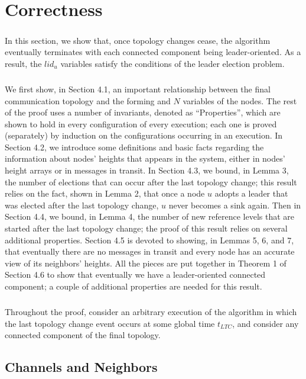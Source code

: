 \chapter{Correctness}
\paragraph{}In this section, we show that, once topology changes cease, the algorithm eventually terminates with each connected component being leader-oriented. As a result, the $lid_u$ variables satisfy the conditions of the leader election problem.
\paragraph{}We first show, in Section 4.1, an important relationship between the final communication topology and the forming and $N$ variables of the nodes. The rest of the proof uses a number of invariants, denoted as “Properties”, which are shown to hold in every configuration of every execution; each one is proved (separately) by induction on the configurations occurring in an execution. In Section 4.2, we introduce some definitions and basic facts regarding the information about nodes' heights that appears in the system, either in nodes' height arrays or in messages in transit. In Section 4.3, we bound, in Lemma 3, the number of elections that can occur after the last topology change; this result relies on the fact, shown in Lemma 2, that once a node $u$ adopts a leader that was elected after the last topology change, $u$ never becomes a sink again. Then in Section 4.4, we bound, in Lemma 4, the number of new reference levels that are started after the last topology change; the proof of this result relies on several additional properties. Section 4.5 is devoted to showing, in Lemmas 5, 6, and 7, that eventually there are no messages in transit and every node has an accurate view of its neighbors' heights. All the pieces are put together in Theorem 1 of Section 4.6 to show that eventually we have a leader-oriented connected component; a couple of additional properties are needed for this result.
\paragraph{}Throughout the proof, consider an arbitrary execution of the algorithm in which the last topology change event occurs at some global time $t_{LTC}$, and consider any connected component of the final topology.
\section{Channels and Neighbors}
